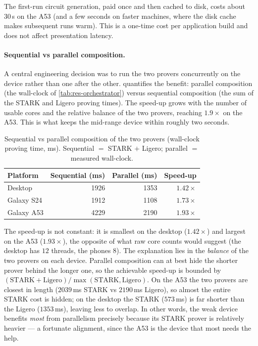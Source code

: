 \documentclass[binding=0.6cm,oneside,noexaminfo]{sapthesis}
\begin{document}
The first-run circuit generation, paid once and then cached to disk, costs about
$30$\,s on the A53 (and a few seconds on faster machines, where the disk cache
makes subsequent runs warm). This is a one-time cost per application build and
does not affect presentation latency.

\paragraph{Sequential vs parallel composition.}
A central engineering decision was to run the two provers concurrently on the
device rather than one after the other.  quantifies the
benefit: parallel composition (the wall-clock of \cref{tab:res-orchestrator})
versus sequential composition (the sum of the STARK and Ligero proving times).
The speed-up grows with the number of usable cores and the relative balance of
the two provers, reaching $1.9\times$ on the A53. This is what keeps the
mid-range device within roughly two seconds.

\begin{table}[ht]
  \centering
  \caption{Sequential vs parallel composition of the two provers (wall-clock
  proving time, ms). Sequential $=$ STARK $+$ Ligero; parallel $=$ measured
  wall-clock.}
  \label{tab:res-composition}
  \small
  \begin{tabular}{@{}lrrr@{}}
    \toprule
    \textbf{Platform} & \textbf{Sequential (ms)} & \textbf{Parallel (ms)} & \textbf{Speed-up} \\
    \midrule
    Desktop    & 1926 & 1353 & $1.42\times$ \\
    Galaxy S24 & 1912 & 1108 & $1.73\times$ \\
    Galaxy A53 & 4229 & 2190 & $1.93\times$ \\
    \bottomrule
  \end{tabular}
\end{table}

The speed-up is not constant: it is smallest on the desktop ($1.42\times$) and
largest on the A53 ($1.93\times$), the opposite of what raw core counts would
suggest (the desktop has $12$ threads, the phones $8$). The explanation lies in
the \emph{balance} of the two provers on each device. Parallel composition can at
best hide the shorter prover behind the longer one, so the achievable speed-up is
bounded by $(\text{STARK}+\text{Ligero})/\max(\text{STARK},\text{Ligero})$. On the
A53 the two provers are closest in length ($2039$\,ms STARK vs $2190$\,ms Ligero),
so almost the entire STARK cost is hidden; on the desktop the STARK ($573$\,ms) is
far shorter than the Ligero ($1353$\,ms), leaving less to overlap. In other words,
the weak device benefits \emph{most} from parallelism precisely because its STARK
prover is relatively heavier --- a fortunate alignment, since the A53 is the device
that most needs the help.
\end{document}
